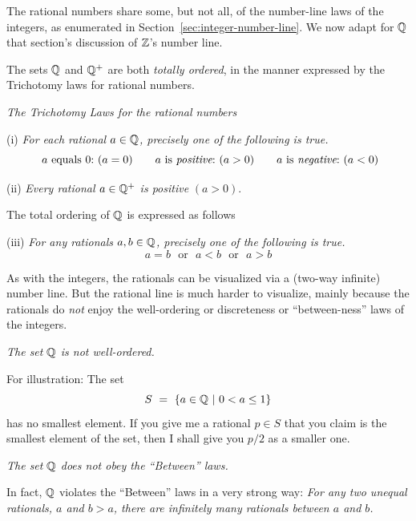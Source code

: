The rational numbers share some, but not all, of the number-line laws of the integers, as enumerated in Section~\ref{sec:integer-number-line}.  We now adapt for $\mathbb{Q}$ that section's discussion of $\mathbb{Z}$'s number line.

\smallskip

The sets $\mathbb{Q}$ and $\mathbb{Q}^+$ are both {\em totally ordered}, in the manner expressed by the Trichotomy laws for rational numbers.

\medskip

\noindent
{\it The Trichotomy Laws for the rational numbers}
 

\noindent (i)
{\it For each rational $a \in \mathbb{Q}$, precisely one of the following is true.}
\[
\mbox{ $a$ equals $0$:} \ (a=0) \ \ \ \
\ \mbox{ $a$ is {\em positive}:} \ (a>0) \ \ \ \
 \ \mbox{ $a$ is {\em negative}:} \ (a<0)
\]

\noindent (ii)
{\it Every rational $a \in \mathbb{Q}^+$ is positive} $(a>0)$.

\medskip

\noindent
The total ordering of $\mathbb{Q}$ is expressed as follows 

\noindent (iii)
{\it For any rationals $a, b \in \mathbb{Q}$, precisely one of the following is true.}
\[  a=b \ \ \ \mbox{or} \ \ \  a<b \ \ \ \mbox{or} \ \ \ a>b \]

\smallskip

As with the integers, the rationals can be visualized via a (two-way infinite) number line.  But the rational line is much harder to visualize, mainly because the rationals do {\em not} enjoy the
well-ordering or discreteness or ``between-ness'' laws of the integers.

\medskip

\noindent
{\em The set $\mathbb{Q}$ is {\em not} well-ordered.}

\smallskip

For illustration:  The set
\[ S \ = \ \{ a \in \mathbb{Q}  \ |\ 0 < a \leq 1 \} \]
has no smallest element.  If you give me a rational $p \in S$ that you claim is the smallest element of the set, then I shall give you $p/2$ as a smaller one.

\medskip

\noindent
{\em The set $\mathbb{Q}$ does {\em not} obey the ``Between'' laws.}

\smallskip

In fact, $\mathbb{Q}$ violates the ``Between'' laws in a very strong way: {\it For any two unequal rationals, $a$ and $b>a$, there are infinitely many rationals between $a$ and $b$.}

